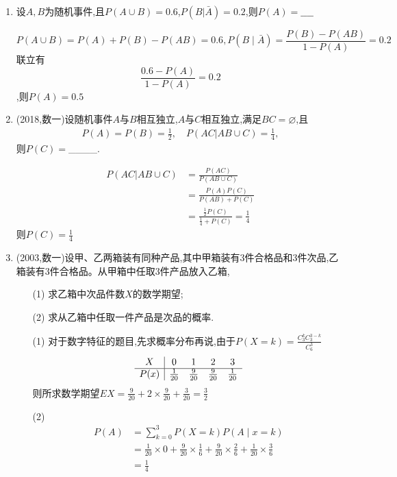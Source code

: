\documentclass[12pt, a4paper, oneside, UTF8]{ctexbook}
\begin{document}
\begin{enumerate}[label=\arabic*.,start=9]
    \item 设$A,B$为随机事件,且$P(A\cup B)=0.6$,$P(B|\bar{A})=0.2$,则$P(A)=\_\_\_\_$
    
    \begin{solution}
    \[P(A\cup B)=P(A) + P(B) - P(AB) = 0.6, P(B\mid\bar{A})=\frac{P(B)-P(AB)}{1-P(A)} = 0.2\]
    联立有
    \[\frac{0.6 - P(A)}{1 - P(A)} = 0.2\],则$P(A)=0.5$
    \end{solution}
    
    \item  (2018,数一)设随机事件$A$与$B$相互独立,$A$与$C$相互独立,满足$BC=\varnothing$,且
    \begin{align*}
        P(A)=P(B)=\frac{1}{2},\quad P(AC|AB\cup C)=\frac{1}{4},
    \end{align*}
    则$P(C)=$\_\_\_\_.
    
    \begin{solution}
    \begin{align*}
        P(AC|AB\cup C)
        &= \frac{P(AC)}{P(AB\cup C)} \\
        &=\frac{P(A)P(C)}{P(AB)+P(C)} \\
        &=\frac{\frac{1}{2}P(C)}{\frac{1}{4} + P(C)} = \frac{1}{4}
    \end{align*}
    则$P(C)=\frac{1}{4}$
    \end{solution}
    
    \item  (2003,数一)设甲、乙两箱装有同种产品,其中甲箱装有3件合格品和3件次品,乙箱装有3件合格品。从甲箱中任取3件产品放入乙箱,
    \begin{enumerate}[label=(\roman*)]
        \item[(1)] 求乙箱中次品件数$X$的数学期望;
        \item[(2)] 求从乙箱中任取一件产品是次品的概率.
    \end{enumerate}

\begin{solution}[用概率计算]
    \begin{enumerate}
    \item[(1)] 对于数字特征的题目,先求概率分布再说,由于$P(X=k)=\frac{C_{3}^{k}C_{3}^{3-k}}{C_{6}^{3}}$
    $$
    \begin{array}{c|c c c c}
    X  & 0 & 1 & 2 & 3 \\ \hline
    P(x)  &  \frac{1}{20}  &  \frac{9}{20}  &  \frac{9}{20}  &  \frac{1}{20}
    \end{array}
    $$
    则所求数学期望$EX=\frac{9}{20} + 2\times \frac{9}{20} + \frac{3}{20} = \frac{3}{2}$
    \item [(2)] 
    \begin{align*}
        P(A) &=\sum_{k=0}^{3}P(X=k)P(A\mid x=k)  \\
        &= \frac{1}{20} \times 0 + \frac{9}{20}\times\frac{1}{6} 
        + \frac{9}{20}\times\frac{2}{6} + \frac{1}{20}\times \frac{3}{6}  \\
        &= \frac{1}{4}
    \end{align*}
    \end{enumerate}
\end{solution}


\end{enumerate}
\end{document}
